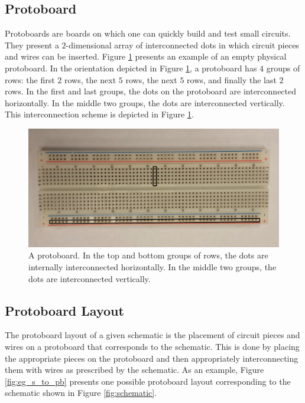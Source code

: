 \subsection{Protoboard}
\label{sec:what_is_protoboard}

Protoboards are boards on which one can quickly build and test
small circuits. They present a $2$-dimensional array of interconnected dots
in which circuit pieces and wires can be inserted. Figure
\ref{fig:physical_protoboard} presents an example of an empty physical
protoboard. In
the orientation depicted in Figure \ref{fig:physical_protoboard}, a protoboard
has $4$ groups of rows: the first $2$ rows, the next $5$ rows, the next $5$
rows, and finally the last $2$ rows. In the first and last groups, the dots on
the protoboard are interconnected horizontally. In the middle
two groups, the dots are interconnected vertically. This
interconnection scheme is depicted in Figure \ref{fig:physical_protoboard}.

\begin{figure}
\begin{center}
\includegraphics[width=\textwidth]{Images/physical_protoboard.jpg}
\caption[Protoboard]{A protoboard. In the top and bottom groups of rows,
the dots are internally interconnected horizontally.
In the middle two groups, the dots are interconnected vertically.}
\label{fig:physical_protoboard}
\end{center}
\end{figure}

\subsection{Protoboard Layout}

The protoboard layout of a given schematic is the placement of circuit pieces
and wires on a protoboard that corresponds to the schematic. This is done by
placing the appropriate pieces on the protoboard and then appropriately
interconnecting them with wires as prescribed by the schematic. As an example,
Figure \ref{fig:eg_s_to_pb} presents one possible protoboard layout
corresponding to the schematic shown in Figure \ref{fig:schematic}.

